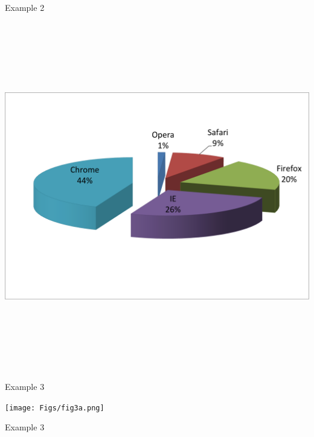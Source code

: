 \documentclass[12pt]{article}
\newcommand{\headsize}{\fontsize{35}{35} \selectfont}
\begin{document}
\newpage


\headsize \color{yellow}
\hfill \begin{minipage}{5.75in}
\centering
Example 2
\end{minipage}

\vspace{30mm}

\centerline{\includegraphics[height=6in]{Figs/fig2e.png}}



\newpage


\headsize \color{yellow}
\hfill \begin{minipage}{5.75in}
\centering
Example 3
\end{minipage}

\vspace{30mm}

\centerline{\texttt{[image: Figs/fig3a.png]}}




\newpage


\headsize \color{yellow}
\hfill \begin{minipage}{5.75in}
\centering
Example 3
\end{minipage}
\end{document}
